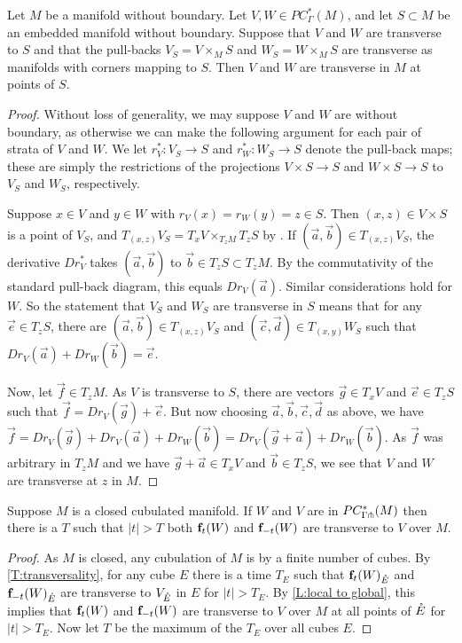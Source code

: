 \begin{lemma}\label{L:local to global}
	Let $M$ be a manifold without boundary.
	Let $V, W \in PC^*_\Gamma(M)$, and let $S \subset M$ be an embedded manifold without boundary.
	Suppose that $V$ and $W$ are transverse to $S$ and that the pull-backs $V_S = V \times_M S$ and $W_S = W \times_M S$ are transverse as manifolds with corners mapping to $S$.
	Then $V$ and $W$ are transverse in $M$ at points of $S$.
\end{lemma}
\begin{proof}
	Without loss of generality, we may suppose $V$ and $W$ are without boundary, as otherwise we can make the following argument for each pair of strata of $V$ and $W$.
	We let $r_V^* \colon V_S \to S$ and $r_W^* \colon W_S \to S$ denote the pull-back maps; these are simply the restrictions of the projections $V \times S \to S$ and $W \times S \to S$ to $V_S$ and $W_S$, respectively.

	Suppose $x \in V$ and $y \in W$ with $r_V(x) = r_W(y) = z \in S$.
	Then $(x,z) \in V \times S$ is a point of $V_S$, and $T_{(x,z)}V_S = T_xV \times_{T_zM} T_zS$ by \cite[Lemma 2.28]{medina2022foundations}.
	If $(\vec a,\vec b) \in T_{(x,z)}V_S$, the derivative $Dr_V^*$ takes $(\vec a,\vec b)$ to $\vec b \in T_z S \subset T_zM$.
	By the commutativity of the standard pull-back diagram, this equals $Dr_V(\vec a)$.
	Similar considerations hold for $W$.
	So the statement that $V_S$ and $W_S$ are transverse in $S$ means that for any $\vec e \in T_z S$, there are $(\vec a,\vec b) \in T_{(x,z)}V_S$ and $(\vec c,\vec d) \in T_{(x,y)}W_S$ such that $Dr_V(\vec a) + Dr_W(\vec b) = \vec e$.

	Now, let $\vec f \in T_z M$.
	As $V$ is transverse to $S$, there are vectors $\vec g \in T_x V$ and  $\vec e \in T_z S$ such that $\vec f = Dr_V(\vec g) + \vec e$.
	But now choosing $\vec a,\vec b,\vec c,\vec d$ as above, we have $\vec f = Dr_V(\vec g) + Dr_V(\vec a) + Dr_W(\vec b) = Dr_V(\vec g + \vec a) +Dr_W(\vec b)$.
	As $\vec f$ was arbitrary in $T_zM$ and we have $\vec g + \vec a \in T_x V$ and $\vec b \in T_z S$, we see that $V$ and $W$ are transverse at $z$ in $M$.
\end{proof}

\begin{corollary}
	Suppose $M$ is a closed cubulated manifold.
	If $W$ and $V$ are in $PC_{\Gamma \pitchfork}^*(M)$ then there is a $T$ such that $|t|>T$ both $\mathbf{f}_t(W)$ and $\mathbf{f}_{-t}(W)$ are transverse to $V$ over $M$.
\end{corollary}
\begin{proof}
	As $M$ is closed, any cubulation of $M$ is by a finite number of cubes.
	By \cref{T:transversality}, for any cube $E$ there is a time $T_E$ such that $\mathbf{f}_t(W)_{\mathring{E}}$ and $\mathbf{f}_{-t}(W)_{\mathring{E}}$ are transverse to $V_{\mathring{E}}$ in $E$ for $|t| > T_E$.
	By \cref{L:local to global}, this implies that $\mathbf{f}_t(W)$ and $\mathbf{f}_{-t}(W)$ are transverse to $V$ over $M$ at all points of $\mathring{E}$ for $|t| > T_E$.
	Now let $T$ be the maximum of the $T_E$ over all cubes $E$.
\end{proof}

